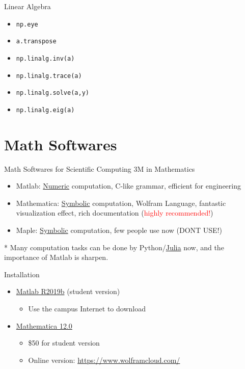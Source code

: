 \documentclass{../TexTemplate/myslide}
\begin{document}
\begin{frame}[fragile]{Linear Algebra}
\begin{itemize}
	\item \verb'np.eye'
	\item \verb'a.transpose'
	\item \verb'np.linalg.inv(a)'
	\item \verb'np.linalg.trace(a)'
	\item \verb'np.linalg.solve(a,y)'
	\item \verb'np.linalg.eig(a)'
\end{itemize}
\end{frame}

\section{Math Softwares}
\begin{frame}
\sectionpage
\end{frame}

\begin{frame}{Math Softwares for Scientific Computing}
3M in Mathematics
\begin{itemize}
	\item Matlab: \underline{Numeric} computation, C-like grammar, efficient for engineering
	\item Mathematica: \underline{Symbolic} computation, Wolfram Language, fantastic visualization effect, rich documentation (\textcolor{red}{highly recommended!})
	\item Maple: \underline{Symbolic} computation, few people use now (DONT USE!)
\end{itemize}
* Many computation tasks can be done by Python/\href{https://julia.mit.edu/}{Julia} now, and the importance of Matlab is sharpen.
\end{frame}

\begin{frame}{Installation}
\begin{itemize}
	\item \href{https://software.sysu.edu.cn/matlabhome}{Matlab R2019b} (student version)
	\begin{itemize}
		\item Use the campus Internet to download
	\end{itemize}
	\item \href{https://tiebamma.github.io/InstallTutorial}{Mathematica 12.0}
	\begin{itemize}
		\item \$50 for student version
		\item Online version: \url{https://www.wolframcloud.com/}
	\end{itemize}
\end{itemize}
\end{frame}
\end{document}
